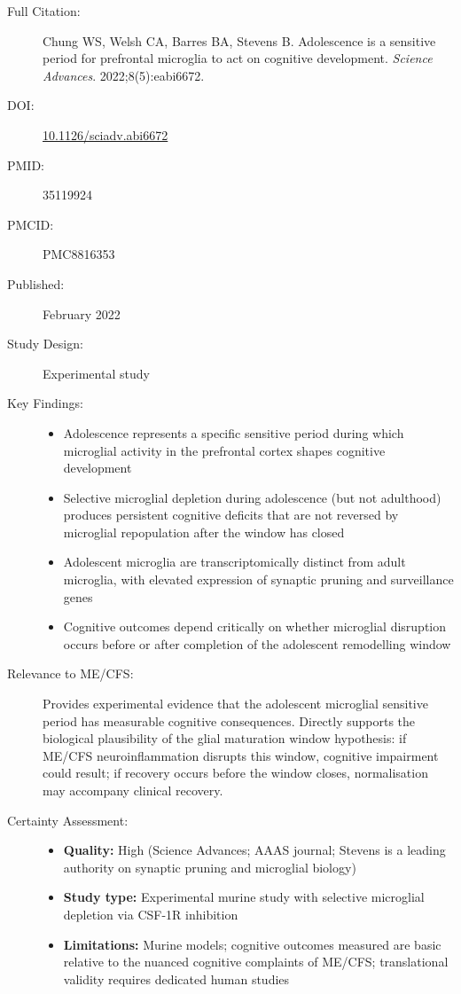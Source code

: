 \begin{description}
    \item[Full Citation:] Chung WS, Welsh CA, Barres BA, Stevens B. Adolescence is a sensitive period for prefrontal microglia to act on cognitive development. \textit{Science Advances}. 2022;8(5):eabi6672.
    \item[DOI:] \href{https://doi.org/10.1126/sciadv.abi6672}{10.1126/sciadv.abi6672}
    \item[PMID:] 35119924
    \item[PMCID:] PMC8816353
    \item[Published:] February 2022
    \item[Study Design:] Experimental study
    \item[Key Findings:]
    \begin{itemize}
        \item Adolescence represents a specific sensitive period during which microglial activity in the prefrontal cortex shapes cognitive development
        \item Selective microglial depletion during adolescence (but not adulthood) produces persistent cognitive deficits that are not reversed by microglial repopulation after the window has closed
        \item Adolescent microglia are transcriptomically distinct from adult microglia, with elevated expression of synaptic pruning and surveillance genes
        \item Cognitive outcomes depend critically on whether microglial disruption occurs before or after completion of the adolescent remodelling window
    \end{itemize}
    \item[Relevance to ME/CFS:] Provides experimental evidence that the adolescent microglial sensitive period has measurable cognitive consequences. Directly supports the biological plausibility of the glial maturation window hypothesis: if ME/CFS neuroinflammation disrupts this window, cognitive impairment could result; if recovery occurs before the window closes, normalisation may accompany clinical recovery.
    \item[Certainty Assessment:]
    \begin{itemize}
        \item \textbf{Quality:} High (Science Advances; AAAS journal; Stevens is a leading authority on synaptic pruning and microglial biology)
        \item \textbf{Study type:} Experimental murine study with selective microglial depletion via CSF-1R inhibition
        \item \textbf{Limitations:} Murine models; cognitive outcomes measured are basic relative to the nuanced cognitive complaints of ME/CFS; translational validity requires dedicated human studies
    \end{itemize}
\end{description}

